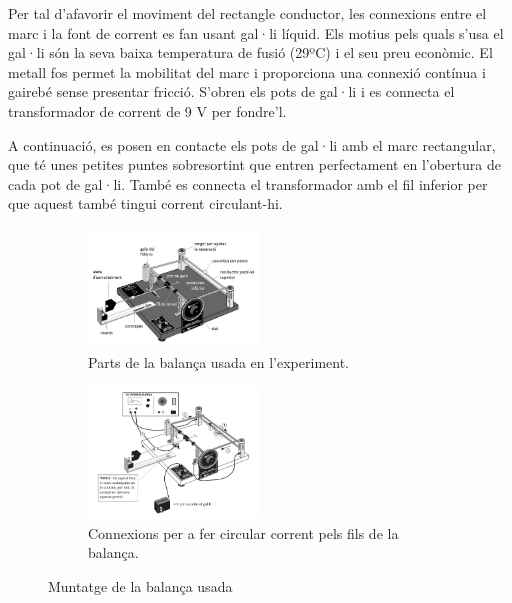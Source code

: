 \documentclass[11pt]{article}
\numberwithin{equation}{section}
\numberwithin{figure}{section}
\numberwithin{table}{section}
\begin{document}
Per tal d'afavorir el moviment del rectangle conductor, les
connexions entre el marc i la font de corrent es fan usant gal·li líquid. Els motius pels quals s'usa el gal·li són la seva baixa temperatura de fusió (29ºC) i el seu preu econòmic. El metall fos permet la mobilitat del marc i proporciona una connexió contínua i gairebé sense presentar fricció. S'obren els pots de gal·li i es connecta el transformador de corrent de 9 V per fondre'l. 

A continuació, es posen en contacte els pots de gal·li amb el marc rectangular, que té unes petites puntes sobresortint que entren perfectament en l'obertura de cada pot de gal·li. També es connecta el transformador amb el fil inferior per que aquest també tingui corrent circulant-hi.


\begin{figure}[H]
    \centering
    \begin{subfigure}{0.4\textwidth}
        \centering
        \includegraphics[width=0.5\textwidth]{PR2_dib_muntatge_parts.jpg}
        \caption{Parts de la balança usada en l'experiment.}
        \label{fig: PR2_dib_muntatge_parts}
    \end{subfigure}
    \hspace{0.1\textwidth}
    \begin{subfigure}{0.4\textwidth}
        \centering
        \includegraphics[width=0.5\textwidth]{PR2_dib_muntatge_corrent.jpg}
        \caption{Connexions per a fer circular corrent pels fils de la balança.}
        \label{fig: PR2_dib_muntatge_corrent}
    \end{subfigure}
\caption{Muntatge de la balança usada}
\end{figure}
\end{document}
